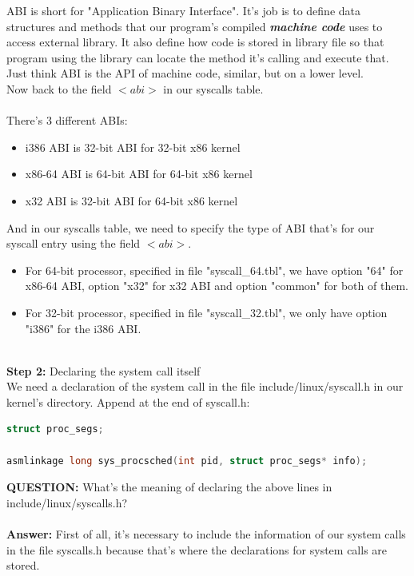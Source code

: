 \documentclass[a4paper]{article}
\begin{document}
ABI is short for "Application Binary Interface". It's job is to define data structures and methods that our program's compiled \textbf{\emph{machine code}} uses to access external library. It also define how code is stored in library file so that program using the library can locate the method it's calling and execute that. Just think ABI is the API of machine code, similar, but on a lower level.\\
Now back to the field $<abi>$ in our syscalls table.\\\\
There's 3 different ABIs:
\begin{itemize}
\item i386 ABI is 32-bit ABI for 32-bit x86 kernel
\item x86-64 ABI is 64-bit ABI for 64-bit x86 kernel
\item x32 ABI is 32-bit ABI for 64-bit x86 kernel
\end{itemize} 
And in our syscalls table, we need to specify the type of ABI that's for our syscall entry using the field $<abi>$.
\begin{itemize}
\item For 64-bit processor, specified in file "syscall\_64.tbl", we have option "64" for x86-64 ABI, option "x32" for x32 ABI and option "common" for both of them.
\item For 32-bit processor, specified in file "syscall\_32.tbl", we only have option "i386" for the i386 ABI.
\end{itemize}\ \\
\textbf{Step 2:} Declaring the system call itself\\
We need a declaration of the system call in the file include/linux/syscall.h in our kernel's directory. Append at the end of syscall.h:
\begin{lstlisting}[language=c]
struct proc_segs;

asmlinkage long sys_procsched(int pid, struct proc_segs* info);
\end{lstlisting}
\textbf{QUESTION:} What's the meaning of declaring the above lines in include/linux/syscalls.h?\\\\
\textbf{Answer:} First of all, it's necessary to include the information of our system calls in the file syscalls.h because that's where the declarations for system calls are stored.
\end{document}
